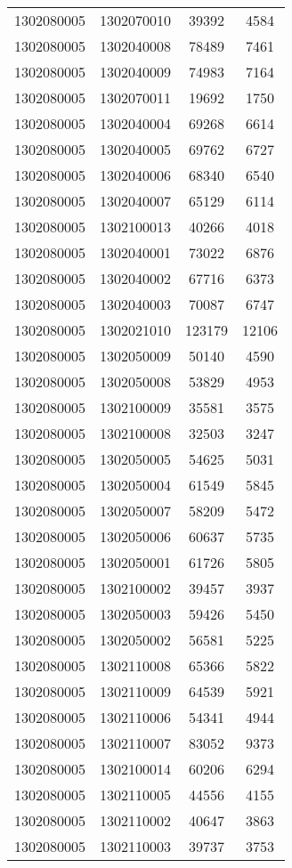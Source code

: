 \begin{longtable}{llcc}
1302080005 & 1302070010 & 39392 & 4584\\
1302080005 & 1302040008 & 78489 & 7461\\
1302080005 & 1302040009 & 74983 & 7164\\
1302080005 & 1302070011 & 19692 & 1750\\
1302080005 & 1302040004 & 69268 & 6614\\
1302080005 & 1302040005 & 69762 & 6727\\
1302080005 & 1302040006 & 68340 & 6540\\
1302080005 & 1302040007 & 65129 & 6114\\
1302080005 & 1302100013 & 40266 & 4018\\
1302080005 & 1302040001 & 73022 & 6876\\
1302080005 & 1302040002 & 67716 & 6373\\
1302080005 & 1302040003 & 70087 & 6747\\
1302080005 & 1302021010 & 123179 & 12106\\
1302080005 & 1302050009 & 50140 & 4590\\
1302080005 & 1302050008 & 53829 & 4953\\
1302080005 & 1302100009 & 35581 & 3575\\
1302080005 & 1302100008 & 32503 & 3247\\
1302080005 & 1302050005 & 54625 & 5031\\
1302080005 & 1302050004 & 61549 & 5845\\
1302080005 & 1302050007 & 58209 & 5472\\
1302080005 & 1302050006 & 60637 & 5735\\
1302080005 & 1302050001 & 61726 & 5805\\
1302080005 & 1302100002 & 39457 & 3937\\
1302080005 & 1302050003 & 59426 & 5450\\
1302080005 & 1302050002 & 56581 & 5225\\
1302080005 & 1302110008 & 65366 & 5822\\
1302080005 & 1302110009 & 64539 & 5921\\
1302080005 & 1302110006 & 54341 & 4944\\
1302080005 & 1302110007 & 83052 & 9373\\
1302080005 & 1302100014 & 60206 & 6294\\
1302080005 & 1302110005 & 44556 & 4155\\
1302080005 & 1302110002 & 40647 & 3863\\
1302080005 & 1302110003 & 39737 & 3753\\

\end{longtable}
